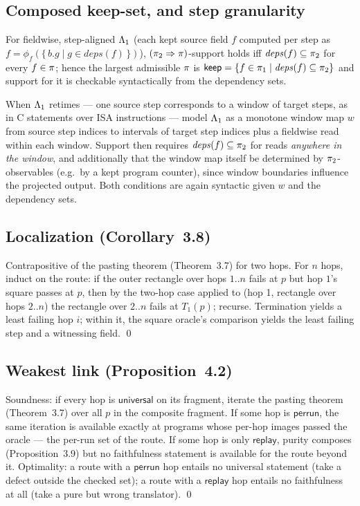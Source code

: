 \subsection{Composed keep-set, and step granularity}

For fieldwise, step-aligned $\Lambda_1$ (each kept source field $f$
computed per step as $f = \phi_f(\{\,b.g \mid g \in \mathit{deps}(f)\,\})$),
$(\pi_2 \Rightarrow \pi)$-support holds iff
$\mathit{deps}(f) \subseteq \pi_2$ for every $f \in \pi$; hence the
largest admissible $\pi$ is
$\mathsf{keep} = \{ f \in \pi_1 \mid \mathit{deps}(f) \subseteq \pi_2 \}$ and
support for it is checkable syntactically from the dependency sets.

When $\Lambda_1$ retimes --- one source step corresponds to a window of
target steps, as in C statements over ISA instructions --- model
$\Lambda_1$ as a monotone window map $w$ from source step indices to
intervals of target step indices plus a fieldwise read within each
window. Support then requires $\mathit{deps}(f) \subseteq \pi_2$ for
reads \emph{anywhere in the window}, and additionally that the window map
itself be determined by $\pi_2$-observables (e.g.\ by a kept program
counter), since window boundaries influence the projected output. Both
conditions are again syntactic given $w$ and the dependency sets.

\subsection{Localization (Corollary~3.8)}

Contrapositive of the pasting theorem (Theorem~3.7) for two hops. For
$n$ hops, induct
on the route: if the outer rectangle over hops $1..n$ fails at $p$ but
hop $1$'s square passes at $p$, then by the two-hop case applied to
(hop 1, rectangle over hops $2..n$) the rectangle over $2..n$ fails at
$T_1(p)$; recurse. Termination yields a least failing hop $i$; within
it, the square oracle's comparison yields the least failing step and a
witnessing field. \qed

\subsection{Weakest link (Proposition~4.2)}

Soundness: if every hop is $\mathsf{universal}$ on its fragment, iterate
the pasting theorem (Theorem~3.7) over all $p$ in the composite
fragment. If some hop is
$\mathsf{perrun}$, the same iteration is available exactly at programs
whose per-hop images passed the oracle --- the per-run set of the route.
If some hop is only $\mathsf{replay}$, purity composes
(Proposition~3.9) but no faithfulness statement is available for the
route beyond it. Optimality: a route with a $\mathsf{perrun}$ hop entails
no universal statement (take a defect outside the checked set); a route
with a $\mathsf{replay}$ hop entails no faithfulness at all (take a pure
but wrong translator). \qed


